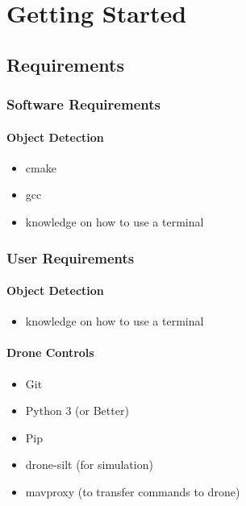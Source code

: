 \chapter{Getting Started}

\section{Requirements}
\subsection{Software Requirements}

\subsubsection{Object Detection}
\begin{itemize}
    \item cmake
    \item gcc
    \item knowledge on how to use a terminal
\end{itemize}

\subsection{User Requirements}
\subsubsection{Object Detection}
\begin{itemize}
    \item knowledge on how to use a terminal
\end{itemize}

\subsubsection{Drone Controls}
\begin{itemize}
    \item Git
    \item Python 3 (or Better)
    \item Pip
    \item drone-silt (for simulation) \cite{dronekit}
    \item mavproxy (to transfer commands to drone) \cite{mavproxy}
\end{itemize}